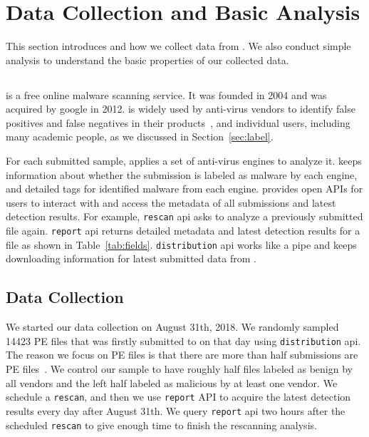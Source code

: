 \section{Data Collection and Basic Analysis}
\label{sec:data}



This section introduces \vt{} and how we collect data from \vt{}. 
We also conduct simple analysis to understand 
the basic properties of our collected data. 

\subsection{\vt{}}
\vt{} is a free online malware scanning service. 
It was founded in 2004 and was acquired by google in 2012. 
\vt{} is widely used by anti-virus vendors to identify false positives and false negatives 
in their products~\cite{huangvt2016bigdata, neeles}, 
and individual users, including many academic people, 
as we discussed in Section~\ref{sec:label}.



For each submitted sample, \vt{} applies a set of anti-virus engines to analyze it. 
\vt{} keeps information about whether the submission is labeled as malware by each engine, 
and detailed tags for identified malware from each engine. 
\vt{} provides open APIs for users to interact with \vt{} 
and access the metadata of all submissions and latest detection results.
For example, \texttt{rescan} api asks \vt{} to analyze a previously submitted file again. 
\texttt{report} api returns detailed metadata and latest 
detection results for a file as shown in Table~\ref{tab:fields}. 
\texttt{distribution} api works like a pipe and keeps 
downloading information for latest submitted data from \vt{}. 

\subsection{Data Collection}

We started our data collection on August 31th, 2018. 
We randomly sampled 14423 PE files that was firstly submitted to \vt{} 
on that day using \texttt{distribution} api.
The reason we focus on PE files is that there are more 
than half \vt{} submissions are PE files~\cite{SongAPsys2016}. 
We control our sample to have roughly 
half files labeled as benign by all vendors 
and the left half labeled as malicious by at least one vendor.
We schedule a \texttt{rescan}, and then we use \texttt{report} API to acquire
the latest detection results every day after August 31th. 
We query \texttt{report} api two hours after the scheduled \texttt{rescan} to give 
\vt{} enough time to finish the rescanning analysis. 

